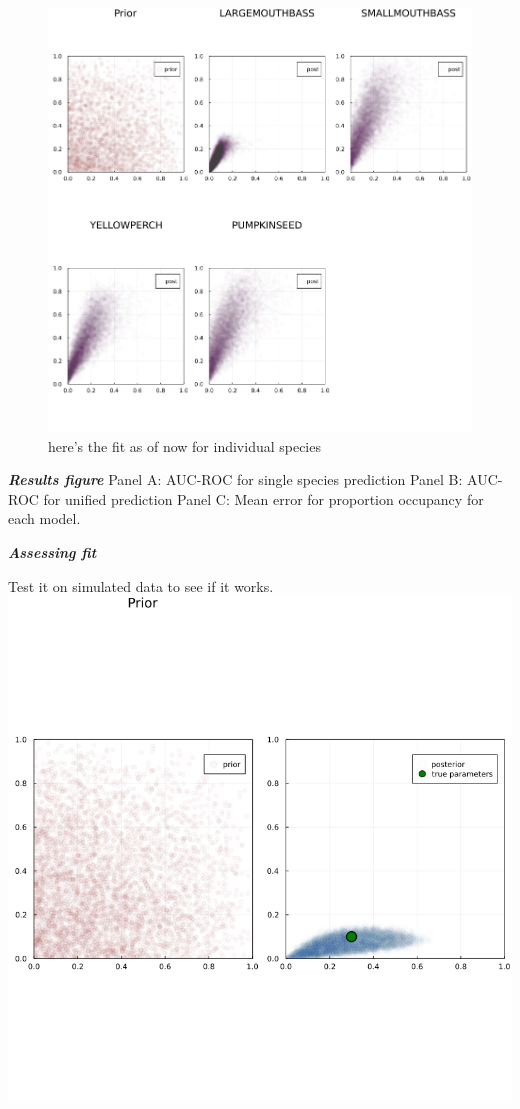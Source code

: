 \documentclass[11pt]{article}
\makeatletter
\def\maxwidth{\ifdim\Gin@nat@width>\linewidth\linewidth
\else\Gin@nat@width\fi}
\let\Oldincludegraphics\includegraphics
\renewcommand{\includegraphics}[1]{\Oldincludegraphics[width=\maxwidth]{#1}}
\makeatother
\begin{document}
\begin{figure}
\hypertarget{fig:abcfit}{%
\centering
\includegraphics{./figures/abcfit.png}
\caption{here's the fit as of now for individual
species}\label{fig:abcfit}
}
\end{figure}

\textbf{\emph{Results figure}} Panel A: AUC-ROC for single species
prediction Panel B: AUC-ROC for unified prediction Panel C: Mean error
for proportion occupancy for each model.

\textbf{\emph{Assessing fit}}

Test it on simulated data to see if it works.
\includegraphics{./figures/comparedtotruth.png}
\end{document}
